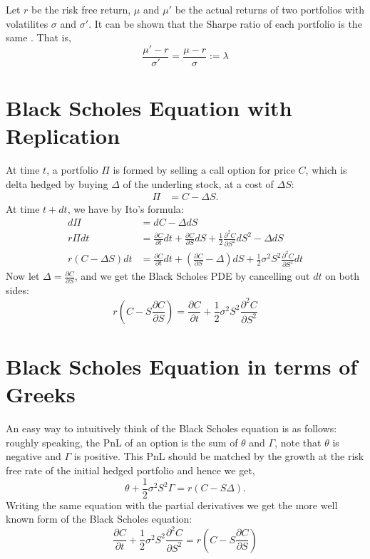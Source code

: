 \documentclass{amsart}
\theoremstyle{plain}
\numberwithin{equation}{section}
\begin{document}
Let $r$ be the risk free return, $\mu$ and $\mu'$ be the 
actual returns of two portfolios with volatilites
$\sigma$ and $\sigma'$. It can be shown that
the Sharpe ratio of each portfolio is 
the same \cite{derman_smile}.
That is,
\begin{equation}
\frac{\mu'-r}{\sigma'} = 
\frac{\mu-r}{\sigma} := \lambda
\end{equation}

\section{Black Scholes Equation with Replication}
At time $t$, a portfolio $\Pi$ is formed
by selling a call option for price $C$, which 
is delta hedged by buying $\Delta$ of 
the underling stock, at a cost of $\Delta S$:
\begin{align*}
\Pi  &= C - \Delta S.
\end{align*}
At time $t + dt$, we have by Ito's formula:
\begin{align*}
d\Pi &= dC - \Delta dS\\
r \Pi dt &= \frac{\partial C}{\partial t} dt + \frac{\partial C}{\partial S} dS + 
\frac{1}{2} \frac{\partial^2 C}{\partial S^2}dS^2 - \Delta dS\\
r(C-\Delta S)dt &= \frac{\partial C}{\partial t} dt + \left(\frac{\partial C}{\partial S} - \Delta \right)dS
+\frac{1}{2} \sigma^2 S^2 \frac{\partial^2 C}{\partial S^2}dt
\end{align*}
Now let $\Delta = \frac{\partial C}{\partial S}$, and we get
the Black Scholes PDE by cancelling out $dt$ on both sides:
\begin{equation}
r\left(C-S \frac{\partial C}{\partial S}\right) = \frac{\partial C}{\partial t} +
\frac{1}{2} \sigma^2 S^2 \frac{\partial^2 C}{\partial S^2}
\end{equation}


\section{Black Scholes Equation in terms of Greeks}
An easy way to intuitively think of the Black Scholes
equation is as follows: roughly speaking, the PnL of 
an option is the sum of $\theta$ and $\Gamma$, note that 
$\theta$ is negative and $\Gamma$ is positive. This PnL
should be matched by the growth at the risk free rate
of the initial hedged portfolio and hence we get,
\begin{equation}
\label{bsGreeks}
\theta + \frac{1}{2}
\sigma^2 S^2 \Gamma
= r(C-S\Delta).
\end{equation}
Writing the same equation with the partial 
derivatives we get the more well known form of the 
Black Scholes equation:
\begin{equation}
\frac{\partial C}{\partial t} + \frac{1}{2}
\sigma^2 S^2 \frac{\partial^2 C}{\partial S^2}
= r(C-S\frac{\partial C}{\partial S})
\end{equation}
\end{document}
